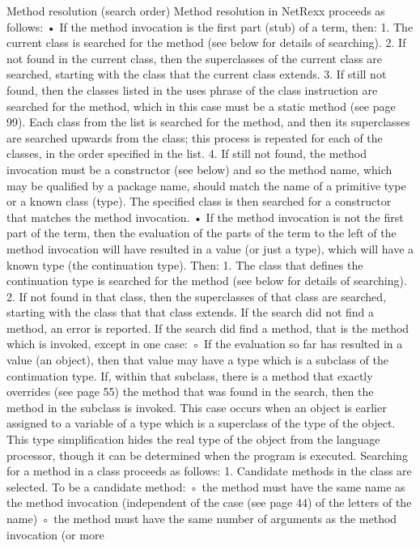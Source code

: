 Method resolution (search order)
Method resolution in NetRexx proceeds as follows:
• If the method invocation is the first part (stub) of a term, then:
1. The current class is searched for the method (see below for details of searching).
2. If not found in the current class, then the superclasses of the current class are searched, starting with the class that the current class extends.
3. If still not found, then the classes listed in the uses phrase of the class instruction are searched for the method, which in this case must be a static method (see page 99). Each class from the list is searched for the method, and then its superclasses are searched upwards from the class; this process is repeated for each of the classes, in the order specified in the list.
4. If still not found, the method invocation must be a constructor (see below) and so the method name, which may be qualified by a package name, should match the name of a primitive type or a known class (type). The specified class is then searched for a constructor that matches the method invocation.
• If the method invocation is not the first part of the term, then the evaluation of the parts of the term to the left of the method invocation will have resulted in a value (or just a type), which will have a known type (the continuation type). Then:
1. The class that defines the continuation type is searched for the method (see below for details of searching).
2. If not found in that class, then the superclasses of that class are searched, starting with the class that that class extends.
If the search did not find a method, an error is reported.
If the search did find a method, that is the method which is invoked, except in one case:
◦ If the evaluation so far has resulted in a value (an object), then that value may have a type which is a subclass of the continuation type. If, within that subclass, there is a method that exactly overrides (see page 55) the method that was found in the search, then the method in the subclass is invoked.
This case occurs when an object is earlier assigned to a variable of a type which is a superclass of the type of the object. This type simplification hides the real type of the object from the language processor, though it can be determined when the program is executed.
Searching for a method in a class proceeds as follows:
1. Candidate methods in the class are selected. To be a candidate method:
◦ the method must have the same name as the method invocation (independent of the case (see page 44) of the letters of the name)
◦ the method must have the same number of arguments as the method invocation (or more
